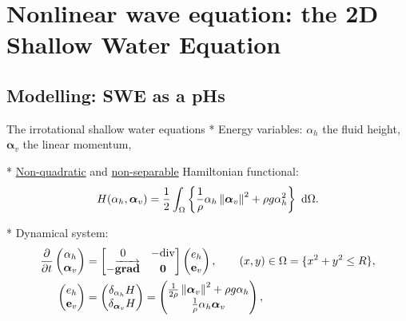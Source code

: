 \documentclass[10pt,aspectratio=43]{ISAE-Beamer}
\newcommand{\Alphav}{\boldsymbol{\alpha}_v}
\newcommand{\bm}{\boldsymbol}
\newcommand{\dd}{{\rm ~d}}
\renewcommand{\div}{{\rm div}}
\newcommand{\energy}[1]{\frac{1}{2} \int_{\Omega} \left\{ #1 \right\} \dd\Omega}
\newcommand{\grad}{\vector{\rm grad}}
\newcommand*{\norm}[1]{\ensuremath{\left\|#1\right\|}}
\renewcommand{\vector}[1]{\overrightarrow{\mathbf{\boldsymbol #1}}}
\begin{document}
\section{Nonlinear wave equation: the 2D Shallow Water Equation}

\subsection{Modelling: SWE as a pHs}


\begin{frame}{The irrotational shallow water equations}
* Energy variables:  $\alpha_h$ the fluid height, $\Alphav$ the linear momentum,

  * \underline{Non-quadratic} and \underline{non-separable}  Hamiltonian functional: 
\begin{equation*}
H(\alpha_h, \Alphav) = \energy{\frac{1}{\rho} \alpha_h \norm{\Alphav}^2 + \rho g \alpha_h^2}.
\end{equation*}

* Dynamical system:
\begin{equation*} 
\begin{aligned}
\frac{\partial}{\partial t}
\begin{pmatrix}
\alpha_h \\
\Alphav \\
\end{pmatrix} &= 
\begin{bmatrix}
0 & -\div \\
-\grad & \bm{0}
\end{bmatrix}
\begin{pmatrix}
e_h\\
\mathbf{e}_v\\
\end{pmatrix}, \qquad (x,y) \in \Omega = \{x^2 + y^2 \le R \}, \\
\begin{pmatrix}
e_h\\
\mathbf{e}_v\\
\end{pmatrix} &= \begin{pmatrix}
\delta_{\alpha_h} H\\
\delta_{\Alphav} H\\
\end{pmatrix} = 
\begin{pmatrix}
\frac{1}{2 \rho} \norm{\Alphav}^2 + \rho g \alpha_h \\
\frac{1}{\rho} \alpha_h \Alphav
\end{pmatrix}, 
\end{aligned}
\end{equation*}


\end{frame}
\end{document}
